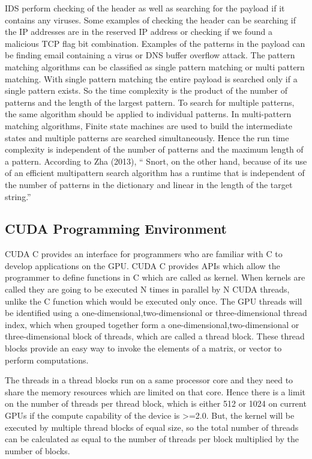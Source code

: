 IDS perform checking of the header as well as searching for the payload if it contains any viruses. Some examples of checking the header can be searching if the IP addresses are in the reserved IP address or checking if we found a malicious TCP flag bit combination. Examples of the patterns in the payload can be finding email containing a virus or DNS buffer overflow attack. The pattern matching algorithms can be classified as single pattern matching or multi pattern matching. With single pattern matching the entire payload is searched only if a single pattern exists. So the time complexity is the product of the number of patterns and the length of the largest pattern. To search for multiple patterns, the same algorithm should be applied to individual patterns. In multi-pattern matching algorithms, Finite state machines are used to build the intermediate states and multiple patterns are searched simultaneously. Hence the run time complexity is independent of the number of patterns and the maximum length of a pattern. According to Zha (2013), “ Snort, on the other hand, because of its use of an efficient multipattern search algorithm has a runtime that is independent of the number of patterns in the dictionary and linear in the length of the target string.” 

\subsection{CUDA Programming Environment}
CUDA C provides an interface for programmers who are familiar with C to develop applications on the GPU. CUDA C provides APIs which allow the programmer to define functions in C which are called as kernel. When kernels are called they are going to be executed N times in parallel by N CUDA threads, unlike the C function which would be executed only once. The GPU threads will be identified using a  one-dimensional,two-dimensional or three-dimensional  thread index, which when grouped together form a  one-dimensional,two-dimensional or three-dimensional  block of threads, which are called a thread block. These thread blocks provide an easy way to invoke the elements of a matrix, or vector to perform computations.

The threads in a thread blocks run on a same processor core and they need to share the memory resources which are limited on that core. Hence there is a limit on the number of threads per thread block, which is either 512 or 1024 on current GPUs if the compute capability of the device is >=2.0. But, the kernel will be executed by multiple thread blocks of equal size, so the total number of threads can be calculated as equal to the number of threads per block multiplied by the number of blocks.


